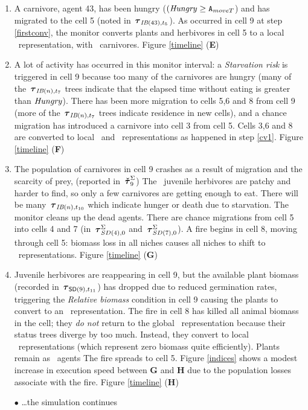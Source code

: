 \begin{enumerate}
\item %
A carnivore, agent 43, has been hungry ($(\mathit{Hungry} \ge
\texttt{A}_{moveT}$) and has migrated to the cell 5
(noted in $\,\boldsymbol{\tau}_{\mathsf{\emph{IB}}(43),t_5}$). As occurred in cell 9 at step \ref{firstconv}, the monitor
converts plants and herbivores in cell 5 to a local
\SD\ rep\-re\-sen\-ta\-tion, with \IB\ carnivores. Figure \ref{timeline}
(\textbf{E})

\item %
A lot of activity has occurred in this monitor interval: 
a \emph{Starvation risk} is triggered in cell
9 because too many of the carnivores are hungry (many of the
$\,\boldsymbol{\tau}_{\mathsf{\emph{IB}}(n),t_7}$ trees indicate that the elapsed time without eating is
greater than $\mathit{Hungry}$). There has been more migration to
cells 5,6 and 8 from cell 9 (more of the $\,\boldsymbol{\tau}_{\mathsf{\emph{IB}}(n),t_7}$ trees
indicate residence in new cells), and a chance migration has introduced a
carnivore into cell 3 from cell 5. Cells 3,6 and 8 are converted to
local \SD\ and \IB\ rep\-re\-sen\-ta\-tions as happened in step
\ref{cv1}. Figure \ref{timeline} (\textbf{F})

\item %
The population of carnivores in cell 9 crashes as a result of
migration and the scarcity of prey, (reported in $\,\boldsymbol{\check{\tau}}^\Sigma_{9}$) The
\IB\ juvenile herbivores are patchy and harder to find, so only a few
carnivores are getting enough to eat. There will be many
$\,\boldsymbol{\tau}_{\mathsf{\emph{IB}}(n),t_{10}}$ which indicate hunger or death due to
starvation. The monitor cleans up the dead agents.  There are chance
migrations from cell 5 into cells 4 and 7 (in $\,\boldsymbol{\tau}^\Sigma_{SD(4),0}$ and
$\,\boldsymbol{\tau}^\Sigma_{SD(7),0}$). A fire begins in cell 8, moving through cell 5:
biomass loss in all niches causes all niches to shift to
\IB\ rep\-re\-sen\-ta\-tions. Figure \ref{timeline} (\textbf{G})

\item %
Juvenile herbivores are reappearing in cell 9, but the available plant
biomass (recorded in $\,\boldsymbol{\tau}_{\mathsf{SD}(9),t_{11}}$) has dropped due to reduced
germination rates, triggering the \emph{Relative biomass} condition in
cell 9 causing the plants to convert to an \IB\ rep\-re\-sen\-ta\-tion.  The
fire in cell 8 has killed all animal biomass in the cell; they
\emph{do not} return to the global \SD\ rep\-re\-sen\-ta\-tion because their
status trees diverge by too much.  Instead, they convert to local
\SD\ rep\-re\-sen\-ta\-tions (which represent zero biomass quite
efficiently). Plants remain as \IB\ agents The fire spreads to cell
5. Figure \ref{indices} shows a modest increase in execution speed
between \textbf{G} and \textbf{H} due to the population losses
associate with the fire. 
Figure \ref{timeline} (\textbf{H})

\item[$\bullet$] \ldots the simulation continues
\end{enumerate}


